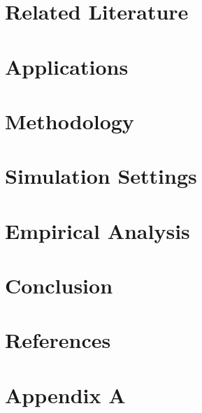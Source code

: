 \documentclass[12pt]{article}
\begin{document}
\section{Related Literature}

\clearpage

\section{Applications}

\clearpage

\section{Methodology}

\clearpage

\section{Simulation Settings}

\clearpage

\section{Empirical Analysis}

\clearpage

\section{Conclusion}

\clearpage


\clearpage
\section*{References}
%
	\printbibliography[heading = none]
\clearpage
\section*{Appendix A}
%

%
%
%
\end{document}
